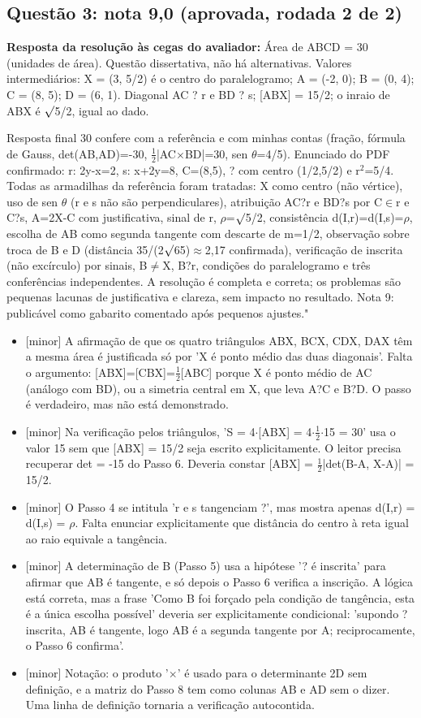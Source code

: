 \documentclass{article}%
\begin{document}
\subsection*{Questão 3: nota 9,0 (aprovada, rodada 2 de 2)}%
\textbf{Resposta da resolução às cegas do avaliador:} Área de ABCD = 30 (unidades de área). Questão dissertativa, não há alternativas. Valores intermediários: X = (3, 5/2) é o centro do paralelogramo; A = (-2, 0); B = (0, 4); C = (8, 5); D = (6, 1). Diagonal AC ? r e BD ? s; {[}ABX{]} = 15/2; o inraio de ABX é $\surd$5/2, igual ao dado.\par %
Resposta final 30 confere com a referência e com minhas contas (fração, fórmula de Gauss, det(AB,AD)=-30, $\frac12$|AC$\times$BD|=30, sen $\theta$=4/5). Enunciado do PDF confirmado: r: 2y-x=2, s: x+2y=8, C=(8,5), ? com centro (1/2,5/2) e r$^2$=5/4. Todas as armadilhas da referência foram tratadas: X como centro (não vértice), uso de sen $\theta$ (r e s não são perpendiculares), atribuição AC?r e BD?s por C$\in$r e C?s, A=2X-C com justificativa, sinal de r, $\rho$=$\surd$5/2, consistência d(I,r)=d(I,s)=$\rho$, escolha de AB como segunda tangente com descarte de m=1/2, observação sobre troca de B e D (distância 35/(2$\surd$65)$\approx$2,17 confirmada), verificação de inscrita (não excírculo) por sinais, B$\neq$X, B?r, condições do paralelogramo e três conferências independentes. A resolução é completa e correta; os problemas são pequenas lacunas de justificativa e clareza, sem impacto no resultado. Nota 9: publicável como gabarito comentado após pequenos ajustes."%
\begin{itemize}%
\item%
{[}minor{]} A afirmação de que os quatro triângulos ABX, BCX, CDX, DAX têm a mesma área é justificada só por 'X é ponto médio das duas diagonais'. Falta o argumento: {[}ABX{]}={[}CBX{]}=$\frac12${[}ABC{]} porque X é ponto médio de AC (análogo com BD), ou a simetria central em X, que leva A?C e B?D. O passo é verdadeiro, mas não está demonstrado.%
\item%
{[}minor{]} Na verificação pelos triângulos, 'S = 4$\cdot${[}ABX{]} = 4$\cdot$$\frac12$$\cdot$15 = 30' usa o valor 15 sem que {[}ABX{]} = 15/2 seja escrito explicitamente. O leitor precisa recuperar det = -15 do Passo 6. Deveria constar {[}ABX{]} = $\frac12$|det(B-A, X-A)| = 15/2.%
\item%
{[}minor{]} O Passo 4 se intitula 'r e s tangenciam ?', mas mostra apenas d(I,r) = d(I,s) = $\rho$. Falta enunciar explicitamente que distância do centro à reta igual ao raio equivale a tangência.%
\item%
{[}minor{]} A determinação de B (Passo 5) usa a hipótese '? é inscrita' para afirmar que AB é tangente, e só depois o Passo 6 verifica a inscrição. A lógica está correta, mas a frase 'Como B foi forçado pela condição de tangência, esta é a única escolha possível' deveria ser explicitamente condicional: 'supondo ? inscrita, AB é tangente, logo AB é a segunda tangente por A; reciprocamente, o Passo 6 confirma'.%
\item%
{[}minor{]} Notação: o produto '$\times$' é usado para o determinante 2D sem definição, e a matriz do Passo 8 tem como colunas AB e AD sem o dizer. Uma linha de definição tornaria a verificação autocontida.%
\end{itemize}%
\end{document}
